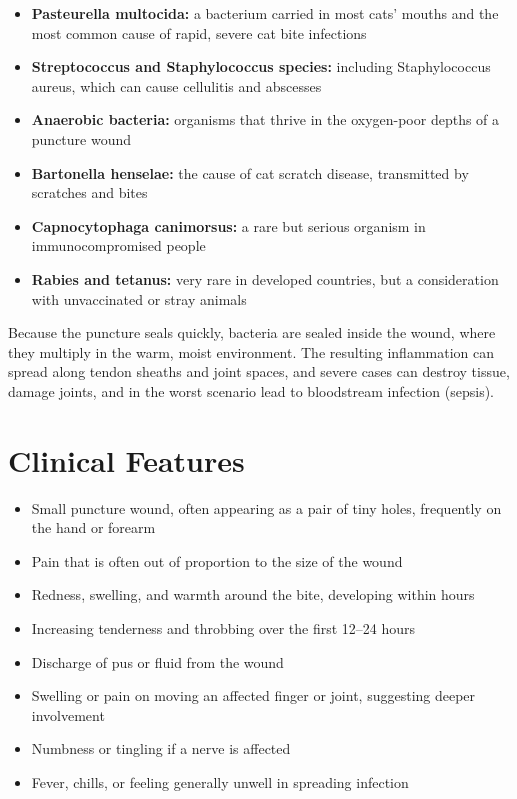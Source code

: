 \begin{itemize}
    \item \textbf{Pasteurella multocida:} a bacterium carried in most cats' mouths and the most common cause of rapid, severe cat bite infections
    \item \textbf{Streptococcus and Staphylococcus species:} including Staphylococcus aureus, which can cause cellulitis and abscesses
    \item \textbf{Anaerobic bacteria:} organisms that thrive in the oxygen-poor depths of a puncture wound
    \item \textbf{Bartonella henselae:} the cause of cat scratch disease, transmitted by scratches and bites
    \item \textbf{Capnocytophaga canimorsus:} a rare but serious organism in immunocompromised people
    \item \textbf{Rabies and tetanus:} very rare in developed countries, but a consideration with unvaccinated or stray animals
\end{itemize}

Because the puncture seals quickly, bacteria are sealed inside the wound, where they multiply in the warm, moist environment. The resulting inflammation can spread along tendon sheaths and joint spaces, and severe cases can destroy tissue, damage joints, and in the worst scenario lead to bloodstream infection (sepsis).

\section*{Clinical Features}
\begin{itemize}
    \item Small puncture wound, often appearing as a pair of tiny holes, frequently on the hand or forearm
    \item Pain that is often out of proportion to the size of the wound
    \item Redness, swelling, and warmth around the bite, developing within hours
    \item Increasing tenderness and throbbing over the first 12--24 hours
    \item Discharge of pus or fluid from the wound
    \item Swelling or pain on moving an affected finger or joint, suggesting deeper involvement
    \item Numbness or tingling if a nerve is affected
    \item Fever, chills, or feeling generally unwell in spreading infection
\end{itemize}

